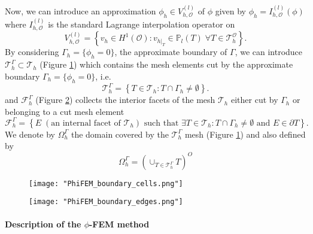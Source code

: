 Now, we can introduce an approximation $\phi_h\in V_{h,\mathcal{O}}^{(l)}$ of $\phi$ given by $\phi_h=I_{h,\mathcal{O}}^{(l)}(\phi)$ where $I_{h,\mathcal{O}}^{(l)}$ is the standard Lagrange interpolation operator on
\begin{equation*}
	V_{h,\mathcal{O}}^{(l)}=\left\{v_h\in H^1(\mathcal{O}):v_{h|_T}\in\mathbb{P}_l(T) \;  \forall T\in\mathcal{T}_h^\mathcal{O}\right\}.
\end{equation*}
By considering $\Gamma_h=\{\phi_h=0\}$, the approximate boundary of $\Gamma$, we can introduce $\mathcal{T}_h^\Gamma\subset \mathcal{T}_h$ (Figure \ref{space4}) which contains the mesh elements cut by the
approximate boundary $\Gamma_h = \{\phi_h=0\}$, i.e. 
\begin{equation*}
	\mathcal{T}_h^\Gamma=\left\{T\in \mathcal{T}_h:T\cap\Gamma_h\ne\emptyset\right\}.
\end{equation*}
and $\mathcal{F}_h^\Gamma$ (Figure \ref{space5}) collects the interior facets of the mesh $\mathcal{T}_h$ either cut by $\Gamma_h$ or belonging to a cut mesh element
\begin{equation*}
	\mathcal{F}_h^\Gamma=\left\{E\;(\text{an internal facet of } \mathcal{T}_h) \text{ such that } \exists T\in \mathcal{T}_h:T\cap\Gamma_h\ne\emptyset \text{ and } E\in\partial T\right\}.
\end{equation*}
We denote by $\Omega_h^\Gamma$ the domain covered by the $\mathcal{T}_h^\Gamma$ mesh (Figure \ref{space4}) and also defined by
\begin{equation*}
	\Omega_h^\Gamma=\left(\cup_{T\in\mathcal{T}_h^\Gamma}T\right)^O
\end{equation*}

\begin{minipage}{0.48\linewidth}
	\begin{figure}[H]
		\centering
		\texttt{[image: "PhiFEM\_boundary\_cells.png"]}
		\label{space4}
	\end{figure}
\end{minipage} \;
\begin{minipage}{0.48\linewidth}
	\begin{figure}[H]
		\centering
		\texttt{[image: "PhiFEM\_boundary\_edges.png"]}
		\label{space5}
	\end{figure}
\end{minipage}

\paragraph{Description of the $\phi$-FEM method}

